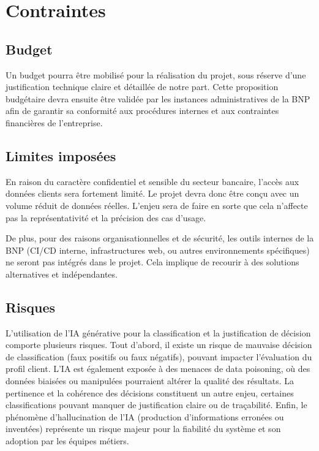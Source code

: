 \section{Contraintes}

\subsection{Budget}

Un budget pourra être mobilisé pour la réalisation du projet, sous réserve d'une justification technique claire et détaillée
de notre part. Cette proposition budgétaire devra ensuite être validée par les instances administratives de la BNP afin
de garantir sa conformité aux procédures internes et aux contraintes financières de l'entreprise.

\subsection{Limites imposées}

En raison du caractère confidentiel et sensible du secteur bancaire, l'accès aux données clients sera fortement limité.
Le projet devra donc être conçu avec un volume réduit de données réelles.
L'enjeu sera de faire en sorte que cela n'affecte pas la représentativité et la précision des cas d'usage.

De plus, pour des raisons organisationnelles et de sécurité, les outils internes de la BNP (CI/CD interne,
infrastructures web, ou autres environnements spécifiques) ne seront pas intégrés dans le projet. Cela implique de recourir
à des solutions alternatives et indépendantes.

\subsection{Risques}

L'utilisation de l'IA générative pour la classification et la justification de décision comporte plusieurs risques. Tout d'abord,
il existe un risque de mauvaise décision de classification (faux positifs ou faux négatifs), pouvant impacter
l'évaluation du profil client. L’IA est également exposée à des menaces de data poisoning, où des données biaisées ou
manipulées pourraient altérer la qualité des résultats. La pertinence et la cohérence des décisions constituent un autre
enjeu, certaines classifications pouvant manquer de justification claire ou de traçabilité. Enfin, le phénomène
d’hallucination de l’IA (production d’informations erronées ou inventées) représente un risque majeur pour la fiabilité
du système et son adoption par les équipes métiers.

